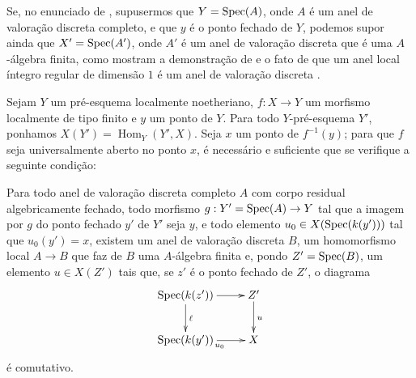 \begin{remark}[14.5.7]
\label{IV.14.5.7}
Se, no enunciado de , supusermos que $Y=\operatorname{Spec}(A)$, onde $A$ é um anel de valoração discreta completo, e que $y$ é o ponto fechado de $Y$, podemos supor ainda que $X'=\operatorname{Spec}(A')$, onde $A'$ é um anel de valoração discreta que é uma $A$-álgebra finita, como mostram a demonstração de  e o fato de que um anel local íntegro regular de dimensão $1$ é um anel de valoração discreta .
\end{remark}

\begin{proposition}[14.5.8]
\label{IV.14.5.8}
Sejam $Y$ um pré-esquema localmente noetheriano, $f:X\to Y$ um morfismo localmente de tipo finito e $y$ um ponto de $Y$.
Para todo $Y$-pré-esquema $Y'$, ponhamos $X(Y')=\operatorname{Hom}_Y(Y',X)$.
Seja $x$ um ponto de $f^{-1}(y)$; para que $f$ seja universalmente aberto no ponto $x$, é necessário e suficiente que se verifique a seguinte condição:

Para todo anel de valoração discreta completo $A$ com corpo residual algebricamente fechado, todo morfismo $g:Y'=\Spec(A)\to Y$ tal que a imagem por $g$ do ponto fechado $y'$ de $Y'$ seja $y$, e todo elemento $u_0\in X(\operatorname{Spec}(k(y')))$ tal que $u_0(y')=x$, existem um anel de valoração discreta $B$, um homomorfismo local $A\to B$ que faz de $B$ uma $A$-álgebra finita e, pondo $Z'=\operatorname{Spec}(B)$, um elemento $u\in X(Z')$ tais que, se $z'$ é o ponto fechado de $Z'$, o diagrama
\[
  \xymatrix{
    \Spec(k(z')) \ar[r] \ar[d]^{\ell} & Z' \ar[d]^{u} \\
    \Spec(k(y')) \ar[r]_{u_0} & X
  }
\]
é comutativo.
\end{proposition}



